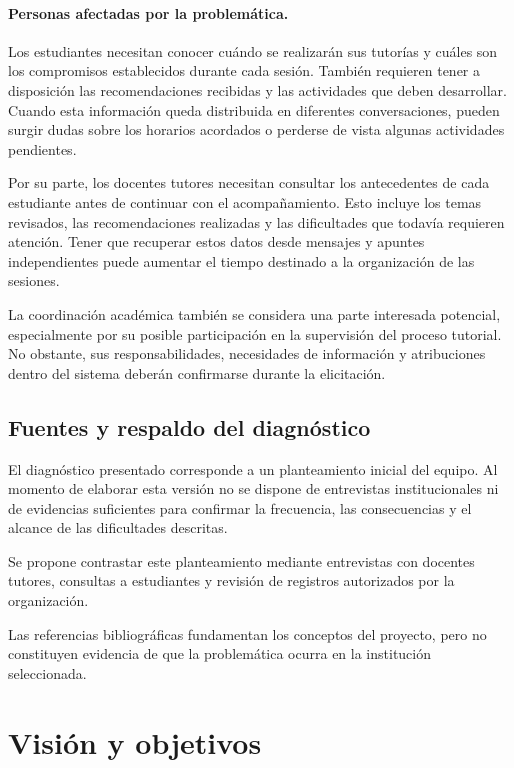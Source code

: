\documentclass[11pt,a4paper]{article}
\begin{document}
\paragraph{Personas afectadas por la problemática.}

Los estudiantes necesitan conocer cuándo se realizarán sus tutorías
y cuáles son los compromisos establecidos durante cada sesión.
También requieren tener a disposición las recomendaciones recibidas
y las actividades que deben desarrollar. Cuando esta información
queda distribuida en diferentes conversaciones, pueden surgir dudas
sobre los horarios acordados o perderse de vista algunas actividades
pendientes.

Por su parte, los docentes tutores necesitan consultar los
antecedentes de cada estudiante antes de continuar con el
acompañamiento. Esto incluye los temas revisados, las recomendaciones
realizadas y las dificultades que todavía requieren atención.
Tener que recuperar estos datos desde mensajes y apuntes
independientes puede aumentar el tiempo destinado a la organización
de las sesiones.

La coordinación académica también se considera una parte interesada
potencial, especialmente por su posible participación en la
supervisión del proceso tutorial. No obstante, sus responsabilidades,
necesidades de información y atribuciones dentro del sistema
deberán confirmarse durante la elicitación.

\subsection{Fuentes y respaldo del diagnóstico}

El diagnóstico presentado corresponde a un planteamiento
inicial del equipo. Al momento de elaborar esta versión
no se dispone de entrevistas institucionales ni de
evidencias suficientes para confirmar la frecuencia,
las consecuencias y el alcance de las dificultades
descritas.

Se propone contrastar este planteamiento mediante
entrevistas con docentes tutores, consultas a estudiantes
y revisión de registros autorizados por la organización.

Las referencias bibliográficas fundamentan los conceptos
del proyecto, pero no constituyen evidencia de que
la problemática ocurra en la institución seleccionada.

\section{Visión y objetivos}
\end{document}
